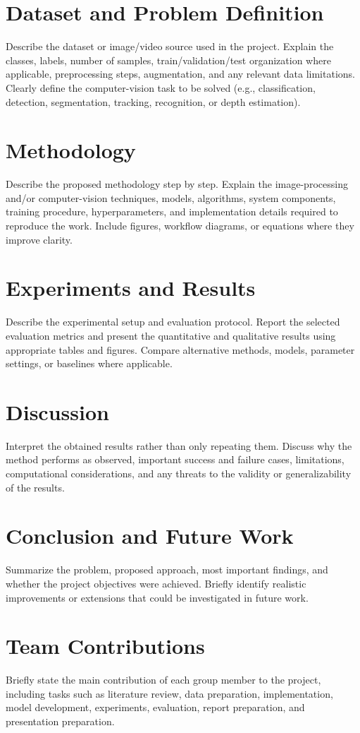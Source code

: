 \documentclass[14pt]{article}
\begin{document}
\section{Dataset and Problem Definition}
Describe the dataset or image/video source used in the project. Explain the classes, labels, number of samples, train/validation/test organization where applicable, preprocessing steps, augmentation, and any relevant data limitations. Clearly define the computer-vision task to be solved (e.g., classification, detection, segmentation, tracking, recognition, or depth estimation).

\section{Methodology}
Describe the proposed methodology step by step. Explain the image-processing and/or computer-vision techniques, models, algorithms, system components, training procedure, hyperparameters, and implementation details required to reproduce the work. Include figures, workflow diagrams, or equations where they improve clarity.

\section{Experiments and Results}
Describe the experimental setup and evaluation protocol. Report the selected evaluation metrics and present the quantitative and qualitative results using appropriate tables and figures. Compare alternative methods, models, parameter settings, or baselines where applicable.

\section{Discussion}
Interpret the obtained results rather than only repeating them. Discuss why the method performs as observed, important success and failure cases, limitations, computational considerations, and any threats to the validity or generalizability of the results.

\section{Conclusion and Future Work}
Summarize the problem, proposed approach, most important findings, and whether the project objectives were achieved. Briefly identify realistic improvements or extensions that could be investigated in future work.

\section{Team Contributions}
Briefly state the main contribution of each group member to the project, including tasks such as literature review, data preparation, implementation, model development, experiments, evaluation, report preparation, and presentation preparation.



\end{document}
